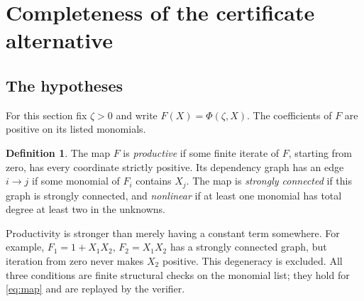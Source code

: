 \documentclass[11pt,a4paper]{article}
\theoremstyle{definition}
\newtheorem{definition}[theorem]{Definition}
\theoremstyle{remark}
\begin{document}
\section{Completeness of the certificate alternative}
\label{sec:complete}

\subsection{The hypotheses}
For this section fix $\zeta>0$ and write $F(X)=\Phi(\zeta,X)$.
The coefficients of $F$ are positive on its listed monomials.

\begin{definition}
The map $F$ is \emph{productive} if some finite iterate of $F$, starting from
zero, has every coordinate strictly positive. Its dependency graph has an
edge $i\to j$ if some monomial of $F_i$ contains $X_j$.
The map is \emph{strongly connected} if this graph is strongly connected,
and \emph{nonlinear} if at least one monomial has total degree at least two
in the unknowns.
\end{definition}

Productivity is stronger than merely having a constant term somewhere.
For example, $F_1=1+X_1X_2$, $F_2=X_1X_2$ has a strongly connected graph,
but iteration from zero never makes $X_2$ positive. This degeneracy is
excluded. All three conditions are finite structural checks on the monomial
list; they hold for \eqref{eq:map} and are replayed by the verifier.
\end{document}
